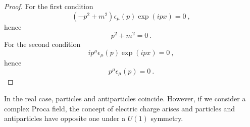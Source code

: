     \begin{proof}
        For the first condition 
        \begin{equation*}
            (- p^2 + m^2) \epsilon_\mu (p) \exp(i p x) = 0 ~,
        \end{equation*}
        hence 
        \begin{equation*}
            p^2 + m^2 = 0~.
        \end{equation*}
        For the second condition
        \begin{equation*}
            i p^\mu \epsilon_\mu (p) \exp(ipx) = 0 ~,
        \end{equation*}
        hence
        \begin{equation*}
            p^\mu \epsilon_\mu (p) = 0~.
        \end{equation*}
    \end{proof}
    In the real case, particles and antiparticles coincide. However, if we consider a complex Proca field, the concept of electric charge arises and particles and antiparticles have opposite one under a $U(1)$ symmetry.

